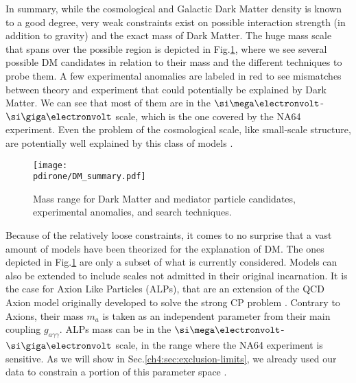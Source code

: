In summary, while the cosmological and Galactic Dark Matter density is known to a good degree, very weak constraints exist on  possible interaction strength (in addition to gravity) and the exact mass of Dark Matter. The huge mass scale that spans over the possible region is depicted in Fig.\ref{fig:dm-mass-range}, where we see several possible DM candidates in relation to their mass and the different techniques to probe them. A few experimental anomalies are labeled in red to see mismatches between theory and experiment that could potentially be explained by Dark Matter. We can see that most of them are in the $\mev$-$\gev$ scale, which is the one covered by the NA64 experiment. Even the problem of the cosmological scale, like small-scale structure, are potentially well explained by this class of models \cite{battaglieri2017cosmic}.

\begin{figure}[bht!]
  \centering
  \texttt{[image: \\pdirone/DM\_summary.pdf]}
  \caption[Mass range for Dark Matter]{Mass range for Dark Matter and mediator particle candidates, experimental anomalies, and search techniques.}
  \label{fig:dm-mass-range}
\end{figure}

Because of the relatively loose constraints, it comes to no surprise that a vast amount of models have been theorized for the explanation of DM. The ones depicted in Fig.\ref{fig:dm-mass-range} are only a subset of what is currently considered. Models can also be extended to include scales not admitted in their original incarnation. It is the case for Axion Like Particles (ALPs), that are an extension of the QCD Axion model originally developed to solve the strong CP problem \cite{PhysRevD.16.1791}. Contrary to Axions, their mass $m_a$ is taken as an independent parameter from their main coupling $g_{a \gamma \gamma}$. ALPs mass can  be in the $\mev$-$\gev$ scale, in the range where the NA64 experiment is sensitive. As we will show in Sec.\ref{ch4:sec:exclusion-limits}, we already used our data to constrain a portion of this parameter space \cite{Banerjee:2020fue}.

